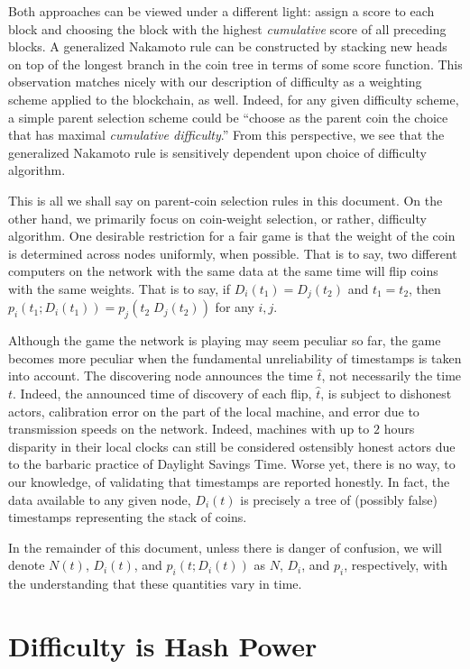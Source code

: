 \documentclass[12pt,english]{mrl}
\theoremstyle{definition}
\numberwithin{equation}{section}
\numberwithin{figure}{section}
\numberwithin{equation}{section}
\numberwithin{equation}{section}
\numberwithin{figure}{section}
\begin{document}
Both approaches can be viewed under a different light: assign a score to each block and choosing the block with the highest \textit{cumulative} score of all preceding blocks. A generalized Nakamoto rule can be constructed by stacking new heads on top of the longest branch in the coin tree in terms of some score function. This observation matches nicely with our description of difficulty as a weighting scheme applied to the blockchain, as well. Indeed, for any given difficulty scheme, a simple parent selection scheme could be ``choose as the parent coin the choice that has maximal \textit{cumulative difficulty}.'' From this perspective, we see that the generalized Nakamoto rule is sensitively dependent upon choice of difficulty algorithm.

This is all we shall say on parent-coin selection rules in this document. On the other hand, we primarily focus on coin-weight selection, or rather, difficulty algorithm. One desirable restriction for a fair game is that the weight of the coin is determined across nodes uniformly, when possible. That is to say, two different computers on the network with the same data at the same time will flip coins with the same weights. That is to say, if $D_i(t_1) = D_j(t_2)$ and $t_1 = t_2$, then $p_i(t_1; D_i(t_1)) = p_j(t_2 \; D_j(t_2))$ for any $i, j$.

Although the game the network is playing may seem peculiar so far, the game becomes more peculiar when the fundamental unreliability of timestamps is taken into account. The discovering node announces the time $\widehat{t}$, not necessarily the time $t$. Indeed, the announced time of discovery of each flip, $\widehat{t}$, is subject to dishonest actors, calibration error on the part of the local machine, and error due to transmission speeds on the network. Indeed, machines with up to $2$ hours disparity in their local clocks can still be considered ostensibly honest actors due to the barbaric practice of Daylight Savings Time. Worse yet, there is no way, to our knowledge, of validating that timestamps are reported honestly. In fact, the data available to any given node, $D_i(t)$ is precisely a tree of (possibly false) timestamps representing the stack of coins.

In the remainder of this document, unless there is danger of confusion, we will denote $N(t)$, $D_i(t)$, and $p_i(t; D_i(t))$ as $N$, $D_i$, and $p_i$, respectively, with the understanding that these quantities vary in time.

\section{Difficulty is Hash Power}\label{diffIsHash}
\end{document}
